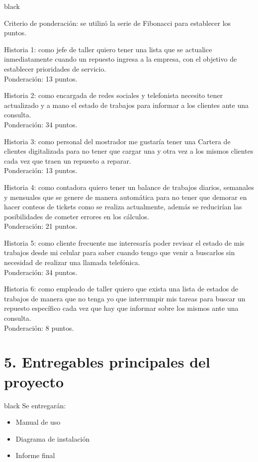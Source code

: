 \documentclass[11pt]{charter}
\begin{document}
\begin{consigna}{black}

Criterio de ponderación: se utilizó la serie de Fibonacci para establecer los puntos.  

Historia 1: como jefe de taller quiero tener una lista que se actualice inmediatamente cuando un repuesto ingresa a la empresa, con el objetivo de establecer prioridades de servicio.
\\Ponderación: 13 puntos.

Historia 2: como encargada de redes sociales y telefonista necesito tener actualizado y a mano el estado de trabajos para informar a los clientes ante una consulta.
\\Ponderación: 34 puntos.

Historia 3: como personal del mostrador me gustaría tener una Cartera de clientes digitalizada para no tener que cargar una y otra vez a los mismos clientes cada vez que traen un repuesto a reparar.
\\Ponderación: 13 puntos.

Historia 4: como contadora quiero tener un balance de trabajos diarios, semanales y mensuales que se genere de manera automática para no tener que demorar en hacer conteos de tickets como se realiza actualmente, además se reducirían las posibilidades de cometer errores en los cálculos.
\\Ponderación: 21 puntos.

Historia 5: como cliente frecuente me interesaría poder revisar el estado de mis trabajos desde mi celular para saber cuando tengo que venir a buscarlos sin necesidad de realizar una llamada telefónica.
\\Ponderación: 34 puntos.

Historia 6: como empleado de taller quiero que exista una lista de estados de trabajos de manera que no tenga yo que interrumpir mis tareas para buscar un repuesto específico cada vez que hay que informar sobre los mismos ante una consulta.
\\Ponderación: 8 puntos.


\end{consigna}

\section{5. Entregables principales del proyecto}
\label{sec:entregables}

\begin{consigna}{black}
Se entregarán: 
\begin{itemize}
\item Manual de uso
\item Diagrama de instalación
\item Informe final

\end{itemize}

\end{consigna}
\end{document}
